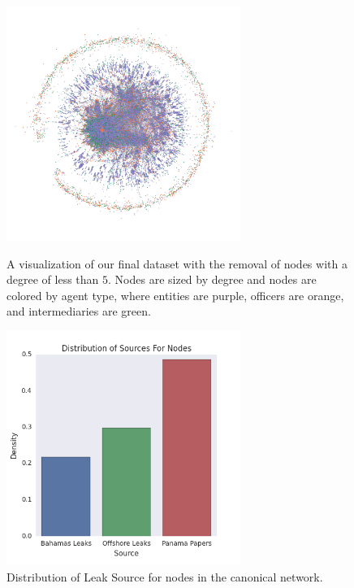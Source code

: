 \documentclass[11pt]{article}
\begin{document}
\begin{figure}[H]
\centering
\begin{minipage}{.5\textwidth}
  \centering
  \includegraphics[width=3in]{figures/figure1.png}
  \caption{A visualization of our final dataset with the removal of
            nodes with a degree of less than $5.$ Nodes are sized by
            degree and nodes are colored by agent type, where entities are
            purple, officers are orange, and intermediaries are green.}
  \label{fig1}
\end{minipage}%
\begin{minipage}{.5\textwidth}
  \centering
  \includegraphics[width=3in]{figures/figure2.png}
  \caption{Distribution of Leak Source for nodes in the canonical network.}
  \label{fig2}
\end{minipage}
\end{figure}
\end{document}
